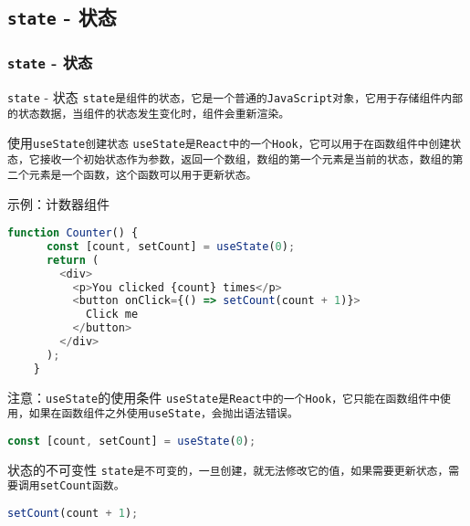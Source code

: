 \documentclass{beamer}
\begin{document}
\subsection{\texttt{state} - 状态}
\begin{frame}
  \frametitle{\texttt{state} - 状态}

  \begin{block}{\texttt{state} - 状态}
    \tt{state}是组件的状态，它是一个普通的\tt{JavaScript}对象，它用于存储组件内部的状态数据，当组件的状态发生变化时，组件会重新渲染。
  \end{block}

  \begin{block}{使用\tt{useState}创建状态}
    \tt{useState}是\tt{React}中的一个\tt{Hook}，它可以用于在函数组件中创建状态，它接收一个初始状态作为参数，返回一个数组，数组的第一个元素是当前的状态，数组的第二个元素是一个函数，这个函数可以用于更新状态。
  \end{block}

  \framebreak

  示例：计数器组件

  \begin{lstlisting}[language=JavaScript]
    function Counter() {
      const [count, setCount] = useState(0);
      return (
        <div>
          <p>You clicked {count} times</p>
          <button onClick={() => setCount(count + 1)}>
            Click me
          </button>
        </div>
      );
    }
\end{lstlisting}

  \framebreak

  \begin{alertblock}{注意：\texttt{useState}的使用条件}
    \tt{useState}是\tt{React}中的一个\tt{Hook}，它只能在函数组件中使用，如果在函数组件之外使用\tt{useState}，会抛出语法错误。
  \end{alertblock}

  \begin{lstlisting}[language=JavaScript]
    const [count, setCount] = useState(0);
\end{lstlisting}

  \begin{alertblock}{状态的不可变性}
    \tt{state}是不可变的，一旦创建，就无法修改它的值，如果需要更新状态，需要调用\tt{setCount}函数。

  \end{alertblock}

  \begin{lstlisting}[language=JavaScript]
    setCount(count + 1);
\end{lstlisting}


\end{frame}
\end{document}
